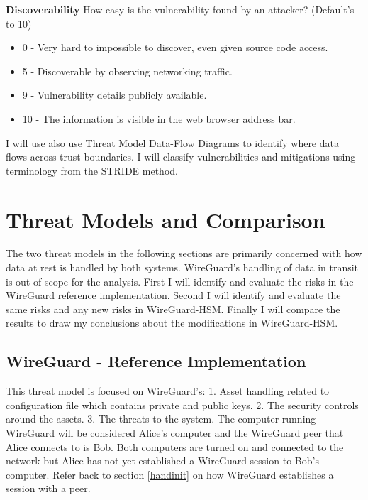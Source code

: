 \documentclass [11pt, proquest] {uwthesis}[2020/02/24]
\begin{document}
\textbf{Discoverability}
How easy is the vulnerability found by an attacker? (Default's to 10)
\begin{small}
\begin{itemize}
\label{dread:Discoverability}
	\item 0 - Very hard to impossible to discover, even given source code access.
    \item 5 - Discoverable by observing networking traffic.
    \item 9 - Vulnerability details publicly available.
    \item 10 - The information is visible in the web browser address bar.
\end{itemize}
\end{small}
\bigskip

I will use also use Threat Model Data-Flow Diagrams to identify where data flows across trust boundaries.
I will classify vulnerabilities and mitigations using terminology from the STRIDE method\cite{hernan_uncover_2019}.

\chapter {Threat Models and Comparison}
The two threat models in the following sections are primarily concerned with how data at rest is handled by both systems. WireGuard's handling of data in transit is out of scope for the analysis.
First I will identify and evaluate the risks in the WireGuard reference implementation. Second I will identify and evaluate the same risks and any new risks in WireGuard-HSM. Finally I will compare the results to draw my conclusions about the modifications in WireGuard-HSM.

\section {WireGuard - Reference Implementation}
\label{wg-ref-analysis}
This threat model is focused on WireGuard's: 1. Asset handling related to configuration file which contains private and public keys. 2. The security controls around the assets. 3. The threats to the system. 
The computer running WireGuard will be considered Alice's computer and the WireGuard peer that Alice connects to is Bob. Both computers are turned on and connected to the network but Alice has not yet established a WireGuard session to Bob's computer. Refer back to section \ref{handinit} on how WireGuard establishes a session with a peer. 
\end{document}
